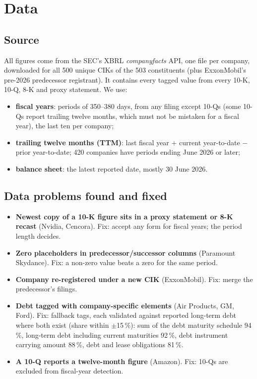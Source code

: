 \documentclass[11pt,a4paper]{article}
\begin{document}
\section{Data}

\subsection{Source}
All figures come from the SEC's XBRL \emph{companyfacts} API, one file per company, downloaded for all 500 unique CIKs of the 503 constituents (plus ExxonMobil's pre-2026 predecessor registrant). It contains every tagged value from every 10-K, 10-Q, 8-K and proxy statement. We use:
\begin{itemize}
  \item \textbf{fiscal years}: periods of 350--380 days, from any filing except 10-Qs (some 10-Qs report trailing twelve months, which must not be mistaken for a fiscal year), the last ten per company;
  \item \textbf{trailing twelve months (TTM)}: last fiscal year $+$ current year-to-date $-$ prior year-to-date; 420 companies have periods ending June 2026 or later;
  \item \textbf{balance sheet}: the latest reported date, mostly 30 June 2026.
\end{itemize}

\subsection{Data problems found and fixed}
\begin{itemize}
  \item \textbf{Newest copy of a 10-K figure sits in a proxy statement or 8-K recast} (Nvidia, Cencora). Fix: accept any form for fiscal years; the period length decides.
  \item \textbf{Zero placeholders in predecessor/successor columns} (Paramount Skydance). Fix: a non-zero value beats a zero for the same period.
  \item \textbf{Company re-registered under a new CIK} (ExxonMobil). Fix: merge the predecessor's filings.
  \item \textbf{Debt tagged with company-specific elements} (Air Products, GM, Ford). Fix: fallback tags, each validated against reported long-term debt where both exist (share within $\pm$15\,\%): sum of the debt maturity schedule 94\,\%, long-term debt including current maturities 92\,\%, debt instrument carrying amount 88\,\%, debt and lease obligations 81\,\%.
  \item \textbf{A 10-Q reports a twelve-month figure} (Amazon). Fix: 10-Qs are excluded from fiscal-year detection.
\end{itemize}
\end{document}
